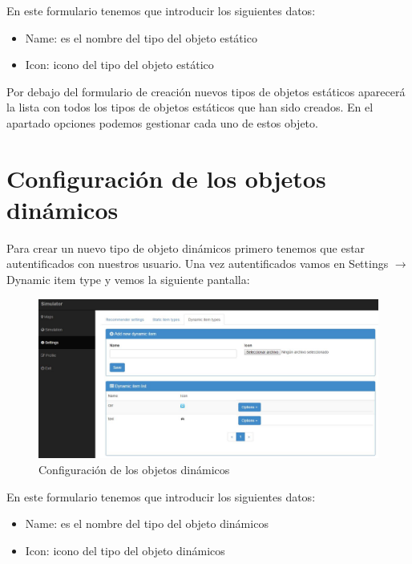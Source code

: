 En este formulario tenemos que introducir los siguientes datos:

\begin{itemize}
	\item Name: es el nombre del tipo del objeto estático
	\item Icon: icono del tipo del objeto estático
\end{itemize}	

Por debajo del formulario de creación nuevos tipos de objetos estáticos aparecerá la lista con todos los tipos de objetos estáticos que han sido creados. En el apartado opciones podemos gestionar cada uno de estos objeto.

\section{Configuración de los objetos dinámicos}\label{sec:confObjDinamicos}

Para crear un nuevo tipo de objeto dinámicos primero tenemos que estar autentificados con nuestros usuario. Una vez autentificados vamos en Settings $\rightarrow$ Dynamic item type y vemos la siguiente pantalla:

\begin{figure}[H]
	\centering\includegraphics[scale=0.25]{imagenes/capitulo4/config-objetos-dinamicos.jpg}
	\caption{Configuración de los objetos dinámicos}
	\label{img:ConfiguracionObjetosDinamicos}
\end{figure}

En este formulario tenemos que introducir los siguientes datos:

\begin{itemize}
	\item Name: es el nombre del tipo del objeto dinámicos
	\item Icon: icono del tipo del objeto dinámicos
\end{itemize}

